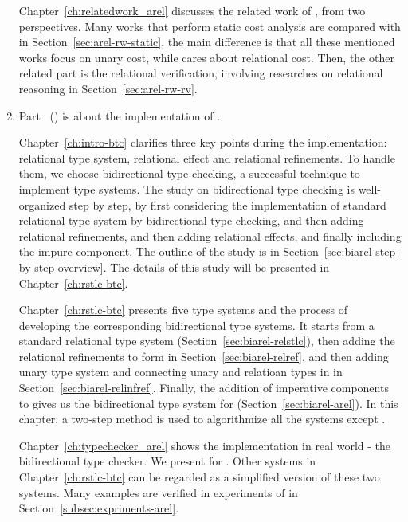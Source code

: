 \begin{enumerate}
    Chapter~\ref{ch:relatedwork_arel} discusses the related work of {\Arel}, from two perspectives. Many works that perform static cost analysis are compared with {\Arel} in Section~\ref{sec:arel-rw-static}, the main difference is that all these mentioned works focus on unary cost, while {\Arel} cares about relational cost. Then, the other related part is the relational verification, involving researches on relational reasoning in Section~\ref{sec:arel-rw-rv}.  
    
    \item Part ~(\BIAREL) is about the implementation of {\Arel}.
    
     Chapter~\ref{ch:intro-btc} clarifies three key points during the implementation: relational type system, relational effect and relational refinements. To handle them,  we choose bidirectional type checking, a successful technique to implement type systems. The study on bidirectional type checking is well-organized step by step, by first considering the implementation of standard relational type system by bidirectional type checking, and then adding relational refinements, and then adding relational effects, and finally including the impure component. The outline of the study is in Section~\ref{sec:biarel-step-by-step-overview}. The details of this study will be presented in Chapter~\ref{ch:rstlc-btc}.
    
    Chapter~\ref{ch:rstlc-btc} presents five type systems and the process of developing the corresponding bidirectional type systems. It starts from a standard relational 
    type system {\relstlc} (Section~\ref{sec:biarel-relstlc}), then adding the relational refinements to form {\relref} in Section~\ref{sec:biarel-relref}, and then adding unary type system and connecting unary and relatioan types in {\relinfref} in Section~\ref{sec:biarel-relinfref}.  Finally, the addition of imperative components to {\Relcost} gives us the bidirectional type system for {\Arel} (Section~\ref{sec:biarel-arel}). In this chapter, a two-step method is used to algorithmize all the systems except {\relstlc}.
    
    Chapter~\ref{ch:typechecker_arel} shows the implementation in real world - the bidirectional type checker. We present  {\BIAREL} for {\Arel}.  Other systems in Chapter~\ref{ch:rstlc-btc} can be regarded as a simplified version of these two systems. Many examples are verified in experiments of  {\BIAREL} in Section~\ref{subsec:expriments-arel}.  
    

\end{enumerate}
